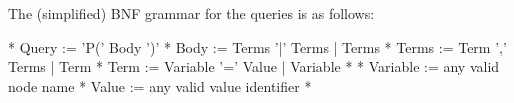 The (simplified) B\-N\-F grammar for the queries is as follows\-:

\begin{DoxyVerb}* Query       := 'P(' Body ')'
* Body        := Terms '|' Terms | Terms
* Terms       := Term ',' Terms | Term
* Term        := Variable '=' Value | Variable
*
* Variable    := {any valid node name}
* Value       := {any valid value identifier}
* \end{DoxyVerb}
 